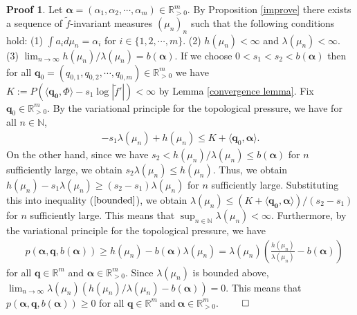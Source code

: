 \documentclass{article}
\theoremstyle{definition}
\newtheorem*{pf}{Proof}
\begin{document}
\begin{pf}
 Let $\boldsymbol{\alpha}=(\alpha_1,\alpha_2,\cdots,\alpha_m)\in \mathbb{R}^m_{>0}$. By Proposition \ref{improve} there exists   
a sequence of $\tilde f$-invariant measures $(\mu_n)_n$ such that the following conditions hold:
(1) $\int a_i d\mu_n = \alpha_i$ for $i\in\lbrace1,2,\cdots,m\rbrace$.
(2) $h(\mu_n)<\infty$ and $\lambda(\mu_n)<\infty$.  
(3) $\lim_{n \to \infty} {h(\mu_n)}/{\lambda(\mu_n)} = b(\boldsymbol{\alpha})$.
If we choose $0<s_1<s_2< b(\boldsymbol{\alpha})$ then for all $\boldsymbol{q}_0=(q_{0,1},q_{0,2},\cdots,q_{0,m})\in \mathbb{R}_{>0}^m$ we have $K:=P(\langle \boldsymbol{q_0},\Phi\rangle- s_1 \log |\tilde f'|) <\infty$ by Lemma \ref{convergence lemma}. Fix $\boldsymbol{q}_0\in\mathbb{R}_{>0}^m$. By the variational principle for the topological pressure, we have 
for all $n \in \mathbb{N}$, 
\begin{align}\label{bounded}
- s_1 \lambda(\mu_n)+h(\mu_n)\leq K +\langle \boldsymbol{q}_0, \boldsymbol{\alpha}\rangle.
\end{align}
On the other hand, since we have 
$s_2 < {h(\mu_n)}/{\lambda(\mu_n)} \leq b(\boldsymbol{\alpha})$ for $n$ sufficiently large, we obtain $s_2 \lambda(\mu_n) \leq h(\mu_n)$. Thus, we obtain $h(\mu_n)-s_1 \lambda(\mu_n) \geq (s_2 - s_1)\lambda(\mu_n)$ for $n$ sufficiently large. Substituting this into inequality ($\ref{bounded}$), we obtain 
$\nonumber
\lambda(\mu_n) \leq ({K+\langle\boldsymbol{q_0},\boldsymbol{\alpha}\rangle})/({s_2-s_1})$
  for $n$ sufficiently large. This means that $\sup_{n\in\mathbb{N}}\lambda(\mu_n)<\infty$. Furthermore, by the variational principle for the topological pressure, we have 
\begin{align}\nonumber
&p(\boldsymbol{\alpha},\boldsymbol{q},b(\boldsymbol{\alpha})) \nonumber
\geq  h(\mu_n) - b(\boldsymbol{\alpha}) \lambda(\mu_n)= \lambda(\mu_n) \left (\frac{h(\mu_n)}{ \lambda(\mu_n)} -b(\boldsymbol{\alpha}) \right )\nonumber
\end{align}
for all $\boldsymbol{q} \in \mathbb{R}^m$ and $\boldsymbol{\alpha}\in \mathbb{R}^m_{>0}$. Since  $\lambda(\mu_n)$ is bounded above,
 $\nonumber
 \lim_{n\to \infty}\lambda(\mu_n) \left ({h(\mu_n)}/{ \lambda(\mu_n)} -b(\boldsymbol{\alpha}) \right ) =0.$
 This means that 
 $p(\boldsymbol{\alpha},\boldsymbol{q},b(\boldsymbol{\alpha}))\geq0$
for all $\boldsymbol{q}\in \mathbb{R}^m\  \text{and}\  \boldsymbol{\alpha}\in \mathbb{R}^m_{>0}$.
$\qed$
\end{pf}
\end{document}
